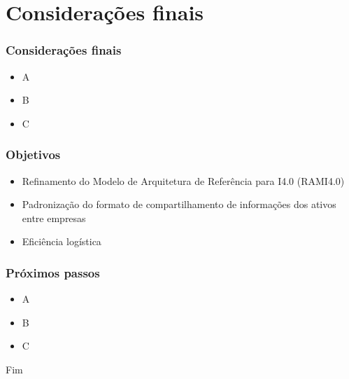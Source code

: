 \documentclass[10pt]{beamer}
\begin{document}
\section{Considerações finais}
\begin{frame}
	
	\frametitle{Considerações finais}
	
	\begin{itemize}
		\item A
		\item B
		\item C
	\end{itemize}
	
\end{frame}
\begin{frame}
	
	\frametitle{Objetivos}
	
	\begin{itemize}
		\item Refinamento do Modelo de Arquitetura de Referência para I4.0 (RAMI4.0)
		\item Padronização do formato de compartilhamento de informações dos ativos entre empresas
		\item Eficiência logística
	\end{itemize}
	
\end{frame}
\begin{frame}
	
	\frametitle{Próximos passos}
	
	\begin{itemize}
		\item A
		\item B
		\item C
	\end{itemize}
	
\end{frame}

\begin{frame}
\Huge{\centerline{Fim}}
\end{frame}
\end{document}
